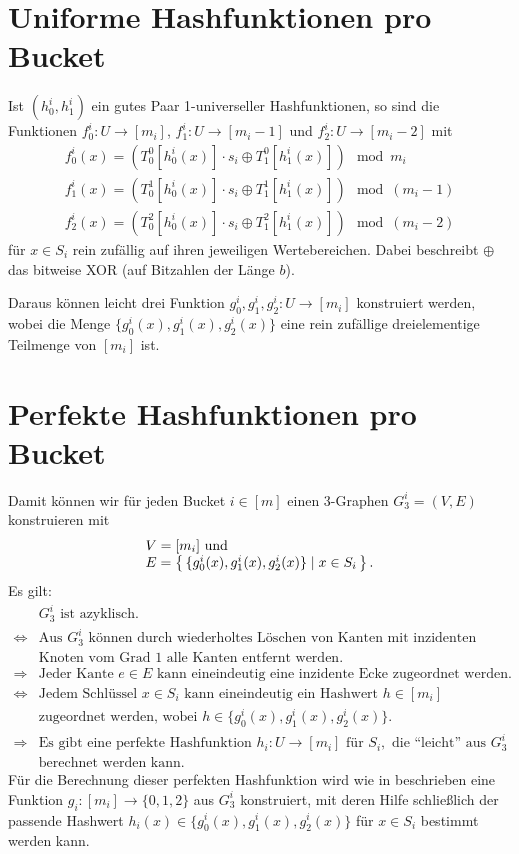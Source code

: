 \documentclass[a4paper,12pt,twoside]{report}
\begin{document}
\section{Uniforme Hashfunktionen pro Bucket}
\label{sec:uniformeHashfunktionen}

Ist $(h_0^i, h_1^i)$ ein gutes Paar 1-universeller Hashfunktionen, so sind die Funktionen $f_0^i\colon U\to[m_i]$, $f_1^i\colon U\to[m_i-1]$ und $f_2^i\colon U\to[m_i-2]$ mit \[\begin{array}{l}f_0^i(x)=\left(T_0^0[h_0^i(x)]\cdot s_i\oplus T_1^0[h_1^i(x)]\right)\mod m_i\\f_1^i(x)=\left(T_0^1[h_0^i(x)]\cdot s_i\oplus T_1^1[h_1^i(x)]\right)\mod (m_i-1)\\f_2^i(x)=\left(T_0^2[h_0^i(x)]\cdot s_i\oplus T_1^2[h_1^i(x)]\right)\mod (m_i-2)\end{array}\] für $x\in S_i$ rein zufällig auf ihren jeweiligen Wertebereichen.
Dabei beschreibt $\oplus$ das bitweise XOR (auf Bitzahlen der Länge $b$).

Daraus können leicht drei Funktion $g_0^i, g_1^i, g_2^i\colon U\to [m_i]$ konstruiert werden, wobei die Menge $\{g_0^i(x), g_1^i(x), g_2^i(x)\}$ eine rein zufällige dreielementige Teilmenge von $[m_i]$ ist.

\section{Perfekte Hashfunktionen pro Bucket}
\label{sec:perfekteHashfunktionProBucket}

Damit können wir für jeden Bucket $i\in[m]$ einen 3-Graphen $G_3^i=(V, E)$ konstruieren mit \[\begin{array}{l}V=[m_i]\text{ und}\\E=\left\{\,\{g_0^i(x), g_1^i(x), g_2^i(x)\}{\;\ifnum\currentgrouptype=16 \middle\fi\mid\;}x\in S_i\,\right\}.\end{array}\]
Es gilt:
\[\begin{array}{cl}
&G_3^i\text{ ist azyklisch.}\\
\Leftrightarrow&\text{Aus }G_3^i\text{ können durch wiederholtes Löschen von Kanten mit inzidenten}\\
&\text{Knoten vom Grad }1\text{ alle Kanten entfernt werden.}\\
\Rightarrow&\text{Jeder Kante }e\in E\text{ kann eineindeutig eine inzidente Ecke zugeordnet werden.}\\
\Leftrightarrow&\text{Jedem Schlüssel }x\in S_i\text{ kann eineindeutig ein Hashwert }h\in[m_i]\\
&\text{zugeordnet werden, wobei }h\in\{g_0^i(x), g_1^i(x), g_2^i(x)\}.\\
\Rightarrow&\text{Es gibt eine perfekte Hashfunktion }h_i\colon U\to[m_i]\text{ für }S_i,\text{ die ``leicht'' aus }G_3^i\\
&\text{berechnet werden kann.}
\end{array}\]
Für die Berechnung dieser perfekten Hashfunktion wird wie in \cite[Theorem 6.4]{czech1997} beschrieben eine Funktion $g_i\colon[m_i]\to\{0, 1, 2\}$ aus $G_3^i$ konstruiert, mit deren Hilfe schließlich der passende Hashwert $h_i(x)\in\{g_0^i(x), g_1^i(x), g_2^i(x)\}$ für $x\in S_i$ bestimmt werden kann.
\end{document}
